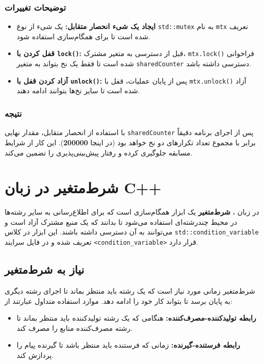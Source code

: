 \documentclass[12pt, a4paper]{report}
\begin{document}
\subsubsection{توضیحات تغییرات}

\begin{itemize}
	\item \textbf{ایجاد یک شیء انحصار متقابل:} یک شیء از نوع \texttt{std::mutex} به نام \texttt{mtx} تعریف شده است تا برای همگام‌سازی استفاده شود.
	\item \textbf{قفل کردن با \texttt{lock()}:} قبل از دسترسی به متغیر مشترک، \texttt{mtx.lock()} فراخوانی شده است تا فقط یک نخ بتواند به متغیر \texttt{sharedCounter} دسترسی داشته باشد.
	\item \textbf{آزاد کردن قفل با \texttt{unlock()}:} پس از پایان عملیات، قفل با \texttt{mtx.unlock()} آزاد شده است تا سایر نخ‌ها بتوانند ادامه دهند.
\end{itemize}

\subsubsection{نتیجه}

با استفاده از انحصار متقابل، مقدار نهایی \texttt{sharedCounter} پس از اجرای برنامه دقیقاً برابر با مجموع تعداد تکرارهای دو نخ خواهد بود (در اینجا \textbf{200000}). این کار از شرایط مسابقه جلوگیری کرده و رفتار پیش‌بینی‌پذیری را تضمین می‌کند.


\section{شرط‌متغیر در زبان C++}

در زبان ، \textbf{شرط‌متغیر} یک ابزار همگام‌سازی است که برای اطلاع‌رسانی به سایر رشته‌ها در محیط چندرشته‌ای استفاده می‌شود تا بدانند که یک منبع مشترک آزاد است و می‌توانند به آن دسترسی داشته باشند. این ابزار در کلاس \texttt{std::condition\_variable} تعریف شده و در فایل سرایند \texttt{<condition\_variable>} قرار دارد.

\subsection{نیاز به شرط‌متغیر}

شرط‌متغیر زمانی مورد نیاز است که یک رشته باید منتظر بماند تا اجرای رشته دیگری به پایان برسد تا بتواند کار خود را ادامه دهد. موارد استفاده متداول عبارتند از:

\begin{itemize}
	\item \textbf{رابطه تولیدکننده-مصرف‌کننده:} هنگامی که یک رشته تولیدکننده باید منتظر بماند تا رشته مصرف‌کننده منابع را مصرف کند.
	\item \textbf{رابطه فرستنده-گیرنده:} زمانی که فرستنده باید منتظر باشد تا گیرنده پیام را پردازش کند.
\end{itemize}
\end{document}
